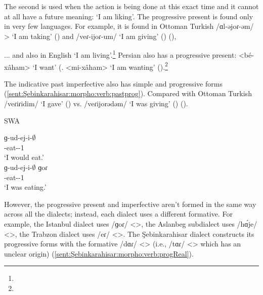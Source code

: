 The second is used when the action is being done at this exact time and it cannot at all have a future meaning: `I am liking'. The progressive present is found only in very few languages. For example, it is found in Ottoman Turkish /ɑl-əjoɾ-əm/ > `I am taking' () and /veɾ-ijoɾ-um/ `I am giving' () (),

\begin{adjarianpage}\label{page:175}\end{adjarianpage}%


... and also in English `I am living'.\footnote{} Persian also has a progressive present: <bé-xâham> `I want'  (. <mi-xâham> `I am wanting'  ().\footnote{}


The indicative past imperfective also has simple and progressive forms (\ref{sent:Şebinkarahisar:morpho:verb:pastprog}). Compared with Ottoman Turkish /veɾiɾidim/ `I gave' () vs. /veɾijorədəm/ `I was giving' () ().



\begin{exe}
	\ex SWA  \label{sent:Şebinkarahisar:morpho:verb:pastprog}
	\begin{xlist}
		\ex\gll ɡ-ud-ej-i-$\emptyset$\\
		{\ind}-eat-{\thgloss}-1{\sg} \\
		\trans `I would eat.' \\
		\ex\gll ɡ-ud-ej-i-$\emptyset$ ɡoɾ \\
		{\ind}-eat-{\thgloss}-1{\sg} {\prog} \\
		\trans `I was eating.' \\
	\end{xlist}
\end{exe}


However, the progressive present and   imperfective aren't formed in the same way across all the dialects; instead, each dialect uses a different formative. For example, the Istanbul dialect uses /ɡoɾ/ <>, the Aslanbeg subdialect uses /h\'ɑje/ <>, the Trabzon dialect uses /eɾ/ <>. The Şebinkarahisar dialect constructs its progressive forms with the formative /dɑɾ/ <> (i.e., /tɑɾ/ <> which has an unclear origin) (\ref{sent:Şebinkarahisar:morpho:verb:progReal}). 


